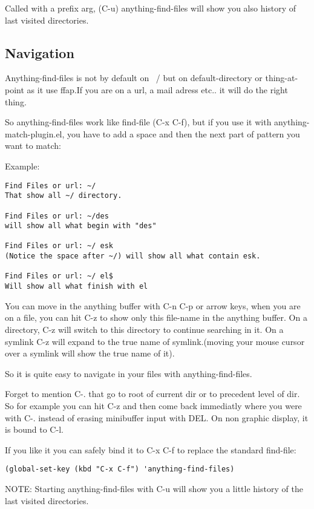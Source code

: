 \documentclass[a4paper,11pt]{article}
\begin{document}
Called with a prefix arg, (C-u) anything-find-files will show you also history of last visited directories.

\subsection{Navigation}
\label{sec:navigation}
Anything-find-files is not by default on ~/ but on default-directory or
thing-at-point as it use ffap.If you are on a url, a mail adress
etc.. it will do the right thing.

So anything-find-files work like find-file (C-x C-f), but if you use it
with anything-match-plugin.el, you have to add a space and then the next
part of pattern you want to match:

Example:

\begin{verbatim}
Find Files or url: ~/
That show all ~/ directory.

Find Files or url: ~/des
will show all what begin with "des"

Find Files or url: ~/ esk
(Notice the space after ~/) will show all what contain esk.

Find Files or url: ~/ el$
Will show all what finish with el

\end{verbatim}
You can move in the anything buffer with C-n C-p or arrow keys, when you
are on a file, you can hit C-z to show only this file-name in the
anything buffer.
On a directory, C-z will switch to this directory to continue searching
in it.
On a symlink C-z will expand to the true name of symlink.(moving your
mouse cursor over a symlink will show the true name of it).

So it is quite easy to navigate in your files with anything-find-files.

Forget to mention C-. that go to root of current dir or to precedent
level of dir.
So for example you can hit C-z and then come back immediatly where you
were with C-. instead of erasing minibuffer input with DEL.
On non graphic display, it is bound to C-l.

If you like it you can safely bind it to C-x C-f to replace the standard
find-file:

\begin{verbatim}
(global-set-key (kbd "C-x C-f") 'anything-find-files)
\end{verbatim}

NOTE:
Starting anything-find-files with C-u will show you a little history of the last visited directories.
\end{document}
